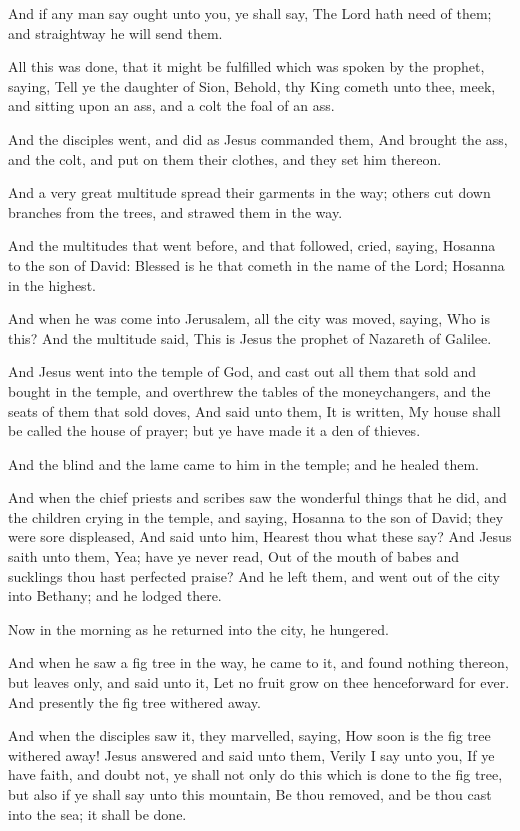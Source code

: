 \Verse And if any man say ought unto you, ye shall say, The Lord hath need of them; and straightway he will send them.

\Verse All this was done, that it might be fulfilled which was spoken by the prophet, saying, \Verse Tell ye the daughter of Sion, Behold, thy King cometh unto thee, meek, and sitting upon an ass, and a colt the foal of an ass.

\Verse And the disciples went, and did as Jesus commanded them, \Verse And brought the ass, and the colt, and put on them their clothes, and they set him thereon.

\Verse And a very great multitude spread their garments in the way; others cut down branches from the trees, and strawed them in the way.

\Verse And the multitudes that went before, and that followed, cried, saying, Hosanna to the son of David: Blessed is he that cometh in the name of the Lord; Hosanna in the highest.

\Verse And when he was come into Jerusalem, all the city was moved, saying, Who is this?  \Verse And the multitude said, This is Jesus the prophet of Nazareth of Galilee.

\Verse And Jesus went into the temple of God, and cast out all them that sold and bought in the temple, and overthrew the tables of the moneychangers, and the seats of them that sold doves, \Verse And said unto them, It is written, My house shall be called the house of prayer; but ye have made it a den of thieves.

\Verse And the blind and the lame came to him in the temple; and he healed them.

\Verse And when the chief priests and scribes saw the wonderful things that he did, and the children crying in the temple, and saying, Hosanna to the son of David; they were sore displeased, \Verse And said unto him, Hearest thou what these say? And Jesus saith unto them, Yea; have ye never read, Out of the mouth of babes and sucklings thou hast perfected praise?  \Verse And he left them, and went out of the city into Bethany; and he lodged there.

\Verse Now in the morning as he returned into the city, he hungered.

\Verse And when he saw a fig tree in the way, he came to it, and found nothing thereon, but leaves only, and said unto it, Let no fruit grow on thee henceforward for ever. And presently the fig tree withered away.

\Verse And when the disciples saw it, they marvelled, saying, How soon is the fig tree withered away!  \Verse Jesus answered and said unto them, Verily I say unto you, If ye have faith, and doubt not, ye shall not only do this which is done to the fig tree, but also if ye shall say unto this mountain, Be thou removed, and be thou cast into the sea; it shall be done.

